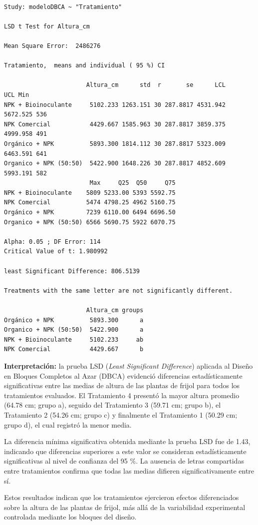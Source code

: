 \documentclass[
  spanish,
  letterpaper,
  DIV=11,
  numbers=noendperiod]{scrreprt}
\begin{document}
\begin{verbatim}

Study: modeloDBCA ~ "Tratamiento"

LSD t Test for Altura_cm 

Mean Square Error:  2486276 

Tratamiento,  means and individual ( 95 %) CI

                       Altura_cm      std  r       se      LCL      UCL Min
NPK + Bioinoculante     5102.233 1263.151 30 287.8817 4531.942 5672.525 536
NPK Comercial           4429.667 1585.963 30 287.8817 3859.375 4999.958 491
Orgánico + NPK          5893.300 1814.112 30 287.8817 5323.009 6463.591 641
Organico + NPK (50:50)  5422.900 1648.226 30 287.8817 4852.609 5993.191 582
                        Max     Q25  Q50     Q75
NPK + Bioinoculante    5809 5233.00 5393 5592.75
NPK Comercial          5474 4798.25 4962 5160.75
Orgánico + NPK         7239 6110.00 6494 6696.50
Organico + NPK (50:50) 6566 5690.75 5922 6070.75

Alpha: 0.05 ; DF Error: 114
Critical Value of t: 1.980992 

least Significant Difference: 806.5139 

Treatments with the same letter are not significantly different.

                       Altura_cm groups
Orgánico + NPK          5893.300      a
Organico + NPK (50:50)  5422.900      a
NPK + Bioinoculante     5102.233     ab
NPK Comercial           4429.667      b
\end{verbatim}

\textbf{Interpretación:} la prueba LSD (\emph{Least Significant
Difference}) aplicada al Diseño en Bloques Completos al Azar (DBCA)
evidenció diferencias estadísticamente significativas entre las medias
de altura de las plantas de frijol para todos los tratamientos
evaluados. El Tratamiento 4 presentó la mayor altura promedio (64.78 cm;
grupo a), seguido del Tratamiento 3 (59.71 cm; grupo b), el Tratamiento
2 (54.26 cm; grupo c) y finalmente el Tratamiento 1 (50.29 cm; grupo d),
el cual registró la menor media.

La diferencia mínima significativa obtenida mediante la prueba LSD fue
de 1.43, indicando que diferencias superiores a este valor se consideran
estadísticamente significativas al nivel de confianza del 95 \%. La
ausencia de letras compartidas entre tratamientos confirma que todas las
medias difieren significativamente entre sí.

Estos resultados indican que los tratamientos ejercieron efectos
diferenciados sobre la altura de las plantas de frijol, más allá de la
variabilidad experimental controlada mediante los bloques del diseño.
\end{document}
